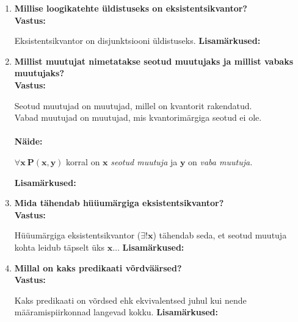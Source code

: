 \documentclass[a4paper,12pt]{article}
\makeatletter
\newcommand{\hl}[1]{\begin{highlightbox}#1\end{highlightbox}}
\newenvironment{question}[1]{%
  \item \textbf{#1} \vspace{0.5em} \\ %
  \textbf{Vastus:} \vspace{0.25em} \\ %
  \def\@lisamarkused{} %
}{%
  \if\relax\detokenize\expandafter{\@lisamarkused}\relax %
  \else
    \vspace{0.5em} %
    \textbf{Lisamärkused:} \\ %
    \@lisamarkused %
  \fi
  \vspace{1em} %
}
\makeatother
\begin{document}
\begin{enumerate}[left=0pt]
\begin{question}{Millise loogikatehte üldistuseks on eksistentsikvantor?}
  Eksistentsikvantor on disjunktsiooni üldistuseks.
\end{question}
\begin{question}{Millist muutujat nimetatakse seotud muutujaks ja millist vabaks muutujaks?}
Seotud muutujad on muutujad, millel on kvantorit rakendatud. \\ 
Vabad muutujad on muutujad, mis kvantorimärgiga seotud ei ole. \\ 
\\ \textbf{Näide:} 
\hl{$\forall\mathbf{x \ P(x,y)}$ korral on $\mathbf{x}$ \textit{seotud muutuja} ja $\mathbf{y}$ on \textit{vaba muutuja.}}
\end{question}

\begin{question}{Mida tähendab hüüumärgiga eksistentsikvantor?}
  Hüüumärgiga eksistentsikvantor ($\mathbf{\exists!x}$) tähendab seda, et seotud muutuja kohta leidub täpselt üks $\textbf{x}\dots$
\end{question}

\begin{question}{Millal on kaks predikaati võrdväärsed?}
  Kaks predikaati on võrdsed ehk ekvivalentsed juhul kui nende määramispiirkonnad langevad kokku.
\end{question}
\newpage
{}



\end{enumerate}
\end{document}
